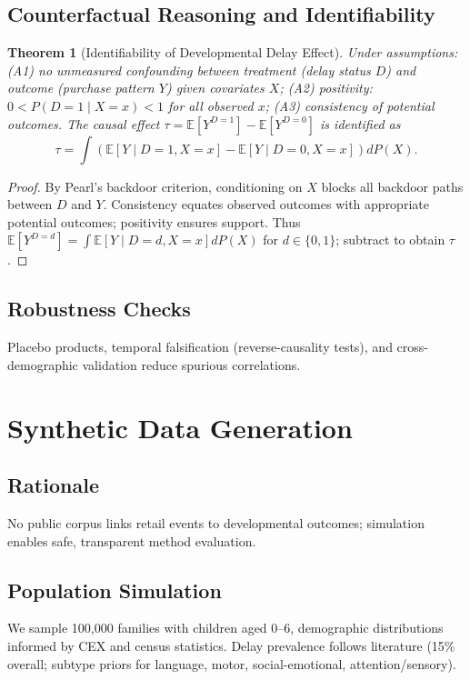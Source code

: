 \documentclass[conference]{IEEEtran}
\theoremstyle{plain}
\newtheorem{theorem}{Theorem}
\theoremstyle{remark}
\begin{document}
\subsection{Counterfactual Reasoning and Identifiability}
\begin{theorem}[Identifiability of Developmental Delay Effect]\label{thm:ident}
Under assumptions: (A1) no unmeasured confounding between treatment (delay status $D$) and outcome (purchase pattern $Y$) given covariates $X$; (A2) positivity: $0<P(D{=}1\mid X{=}x)<1$ for all observed $x$; (A3) consistency of potential outcomes. The causal effect $\tau = \mathbb{E}[Y^{D=1}] - \mathbb{E}[Y^{D=0}]$ is identified as
\begin{equation*}
\tau = \int \left( \mathbb{E}[Y\mid D{=}1,X{=}x] - \mathbb{E}[Y\mid D{=}0,X{=}x] \right) dP(X).
\end{equation*}
\end{theorem}
\begin{proof}
By Pearl's backdoor criterion, conditioning on $X$ blocks all backdoor paths between $D$ and $Y$. Consistency equates observed outcomes with appropriate potential outcomes; positivity ensures support. Thus $ \mathbb{E}[Y^{D=d}] = \int \mathbb{E}[Y\mid D{=}d,X{=}x] dP(X)$ for $d\in\{0,1\}$; subtract to obtain $\tau$.
\end{proof}

\subsection{Robustness Checks}
Placebo products, temporal falsification (reverse-causality tests), and cross-demographic validation reduce spurious correlations.

\section{Synthetic Data Generation}\label{sec:synthetic}
\subsection{Rationale}
No public corpus links retail events to developmental outcomes; simulation enables safe, transparent method evaluation.

\subsection{Population Simulation}
We sample 100{,}000 families with children aged 0--6, demographic distributions informed by CEX and census statistics. Delay prevalence follows literature (15\% overall; subtype priors for language, motor, social-emotional, attention/sensory).
\end{document}
